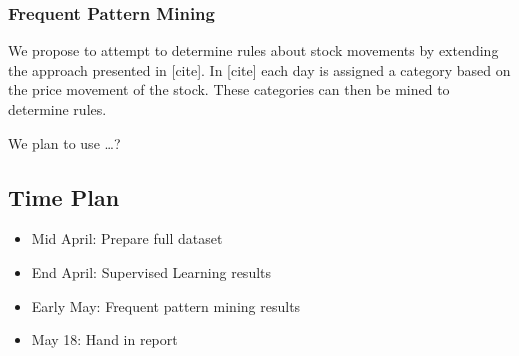 \documentclass[11pt]{article}
\begin{document}
\vspace{-5pt}
\subsubsection*{Frequent Pattern Mining }

We propose to attempt to determine rules about stock movements by extending the
approach presented in [cite]. In [cite] each day is assigned a
category based on the price movement of the stock. These categories can then be
mined to determine rules.

 
We plan to use \dots ?

\vspace{-10pt}
\subsection*{Time Plan}
\begin{itemize}
    \setlength{\itemsep}{1pt}
    \setlength{\parskip}{0pt}
    \setlength{\parsep}{0pt}
    \item Mid April: Prepare full dataset
    \item End April: Supervised Learning results
    \item Early May: Frequent pattern mining results
    \item May 18: Hand in report
\end{itemize}
\end{document}
